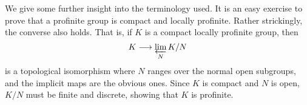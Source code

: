We give some further insight into the terminology used. It is an easy exercise to prove that a profinite group is compact and locally profinite. Rather strickingly, the converse also holds. That is, if $K$ is a compact locally profinite group, then
$$K\longrightarrow\varprojlim_N K/N$$
is a topological isomorphism where $N$ ranges over the normal open subgroups, and the implicit maps are the obvious ones. Since $K$ is compact and $N$ is open, $K/N$ must be finite and discrete, showing that $K$ is profinite.